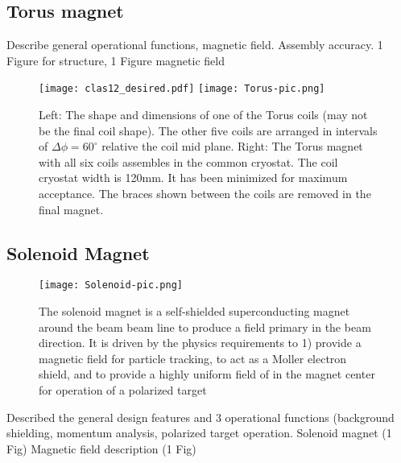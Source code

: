 \subsection{Torus magnet}
\label{torus}
Describe general operational functions, magnetic field. Assembly accuracy.
1 Figure for structure, 1 Figure magnetic field
\vspace{0.3cm}\noindent
\begin{figure}[h]
\texttt{[image: clas12\_desired.pdf]}
\texttt{[image: Torus-pic.png]}
\caption{Left: The shape and dimensions of one of the Torus coils (may not be the final coil shape).
The other five coils are arranged in intervals of $\Delta{\phi} = 60^\circ$ relative the coil mid plane.
Right: The Torus magnet with all six coils assembles in the common cryostat. The coil cryostat width is 120mm. It
has been minimized for maximum acceptance. The braces shown between the coils are removed in the final magnet. }
\end{figure}
\vspace{3cm}



\subsection{Solenoid Magnet}
\label{solenoid}
\vspace{0.3cm}\noindent

\begin{figure}[h]
\texttt{[image: Solenoid-pic.png]}
\caption{The solenoid magnet is a self-shielded superconducting magnet around the beam beam line
to produce a field primary in the beam direction. It is driven by the physics requirements to 1) provide
a magnetic field for particle tracking, to act as a Moller electron shield, and to provide
a highly uniform field of in the magnet center for operation of a polarized target}
\end{figure}

Described the general design features and 3 operational functions (background shielding,
momentum analysis, polarized target operation.
Solenoid magnet (1 Fig)
Magnetic field description (1 Fig)
